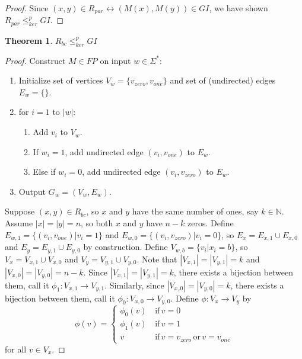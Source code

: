 \documentclass{article}
\newtheorem{theorem}{Theorem}[section]
\theoremstyle{definition}
\newcommand{\plain}[1]{\,\text{#1}\,}
\newcommand{\sigmastar}{\Sigma^{*}}
\newcommand{\kr}{\leq^{p}_{ker}}
\begin{document}
\begin{proof}
  Since $(x,y)\in R_{par} \leftrightarrow (M(x), M(y)) \in GI$, we have shown
  $R_{par} \kr GI$.
\end{proof}

\begin{theorem}$R_{bc}\kr GI$\end{theorem}
\begin{proof}
  
  Construct $M\in FP$ on input $w \in \sigmastar$:
  \begin{enumerate}
  \item Initialize set of vertices $V_w=\{v_{zero}, v_{one}\}$ and set of
    (undirected) edges $E_w=\{\}$.
  \item for $i=1$ to $|w|$:
    \begin{enumerate}
    \item Add $v_i$ to $V_w$.
    \item If $w_i = 1$, add undirected edge $(v_i, v_{one})$ to $E_w$.
    \item Else if $w_i = 0$, add undirected edge $(v_i, v_{zero})$ to $E_w$.
    \end{enumerate}
  \item Output $G_w=(V_w,E_w)$.
  \end{enumerate}
  
  Suppose $(x,y)\in R_{bc}$, so $x$ and $y$ have the same number of ones, say
  $k\in\mathbb{N}$. Assume $|x|=|y|=n$, so both $x$ and $y$ have $n-k$
  zeros. Define $E_{w,1}=\{(v_i, v_{one})|v_i = 1\}$ and $E_{w,0}=\{(v_i,
  v_{zero})|v_i = 0\}$, so $E_x = E_{x,1}\cup E_{x,0}$ and $E_y = E_{y,1} \cup
  E_{y,0}$ by construction. Define $V_{w,b}=\{v_i|x_i=b\}$, so $V_x=V_{x,1}
  \cup V_{x,0}$ and $V_y=V_{y,1} \cup V_{y,0}$. Note that
  $|V_{x,1}|=|V_{y,1}|=k$ and $|V_{x,0}|=|V_{y,0}|=n-k$. Since
  $|V_{x,1}|=|V_{y,1}|=k$, there exists a bijection between them, call it
  $\phi_1:V_{x,1}\to V_{y,1}$. Similarly, since $|V_{x,0}|=|V_{y,0}|=k$, there
  exists a bijection between them, call it $\phi_0:V_{x,0}\to V_{y,0}$. Define
  $\phi:V_x\to V_y$ by 
  \begin{displaymath}
    \phi(v) = 
    \begin{cases}
      \phi_0(v) & \plain{if} v = 0\\
      \phi_1(v) & \plain{if} v = 1\\
      v & \plain{if} v = v_{zero} \plain{or} v = v_{one}
    \end{cases}
  \end{displaymath}
  for all $v\in V_x$.


\end{proof}
\end{document}
